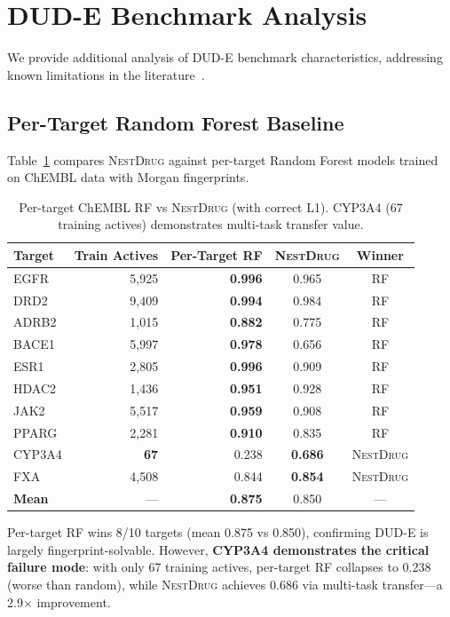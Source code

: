 \documentclass[sigconf]{acmart}
\newcommand{\methodname}{\textsc{NestDrug}}
\begin{document}
\section{DUD-E Benchmark Analysis}
\label{app:dude_analysis}

We provide additional analysis of DUD-E benchmark characteristics, addressing known limitations in the literature~\cite{wallach_2018_dude_bias}.

\subsection{Per-Target Random Forest Baseline}

Table~\ref{tab:per_target_rf} compares \methodname{} against per-target Random Forest models trained on ChEMBL data with Morgan fingerprints.

\begin{table}[h]
\caption{Per-target ChEMBL RF vs \methodname{} (with correct L1). CYP3A4 (67 training actives) demonstrates multi-task transfer value.}
\label{tab:per_target_rf}
\centering
\small
\begin{tabular}{@{}lrrcc@{}}
\toprule
Target & Train Actives & Per-Target RF & \methodname{} & Winner \\
\midrule
EGFR & 5{,}925 & \textbf{0.996} & 0.965 & RF \\
DRD2 & 9{,}409 & \textbf{0.994} & 0.984 & RF \\
ADRB2 & 1{,}015 & \textbf{0.882} & 0.775 & RF \\
BACE1 & 5{,}997 & \textbf{0.978} & 0.656 & RF \\
ESR1 & 2{,}805 & \textbf{0.996} & 0.909 & RF \\
HDAC2 & 1{,}436 & \textbf{0.951} & 0.928 & RF \\
JAK2 & 5{,}517 & \textbf{0.959} & 0.908 & RF \\
PPARG & 2{,}281 & \textbf{0.910} & 0.835 & RF \\
CYP3A4 & \textbf{67} & 0.238 & \textbf{0.686} & \methodname{} \\
FXA & 4{,}508 & 0.844 & \textbf{0.854} & \methodname{} \\
\midrule
\textbf{Mean} & --- & \textbf{0.875} & 0.850 & --- \\
\bottomrule
\end{tabular}
\end{table}

Per-target RF wins 8/10 targets (mean 0.875 vs 0.850), confirming DUD-E is largely fingerprint-solvable. However, \textbf{CYP3A4 demonstrates the critical failure mode}: with only 67 training actives, per-target RF collapses to 0.238 (worse than random), while \methodname{} achieves 0.686 via multi-task transfer---a 2.9$\times$ improvement.
\end{document}
